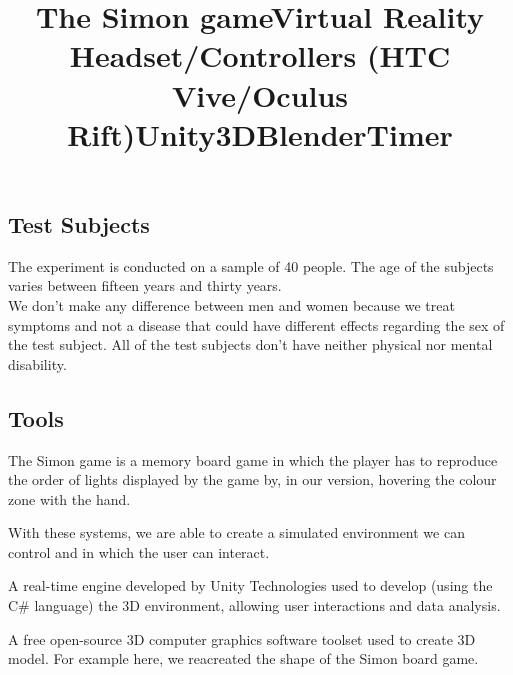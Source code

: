 \documentclass[12pt, openany, twocolumn]{article}
\begin{document}
    \subsection{Test Subjects}
    The experiment is conducted on a sample of 40 people. The age of the subjects varies between fifteen years and thirty years.
    \\

    We don’t make any difference between men and women because we treat symptoms and not a disease that could have different effects regarding the sex of the test subject. All of the test subjects don’t have neither physical nor mental disability.
    
    \subsection{Tools}
        \title{\textbf{The Simon game}} \vspace{0.25cm}

        \noindent The Simon game is a memory board game in which the player has to reproduce the order of lights displayed by the game by, in our version, hovering the colour zone with the hand. \\

        \noindent \title{\textbf{Virtual Reality Headset/Controllers (HTC Vive/Oculus Rift)}} \vspace{0.25cm}

        \noindent With these systems, we are able to create a simulated environment we can control and in which the user can interact. \\
    
        \noindent \title{\textbf{Unity3D}} \vspace{0.25cm}

        \noindent A real-time engine developed by Unity Technologies used to develop (using the C\# language) the 3D environment, allowing user interactions and data analysis. \\

        \noindent \title{\textbf{Blender}} \vspace{0.25cm}

        \noindent A free open-source 3D computer graphics software toolset used to create 3D model. For example here, we reacreated the shape of the Simon board game. \\
        
        \noindent \title{\textbf{Timer}} \vspace{0.25cm}
\end{document}
